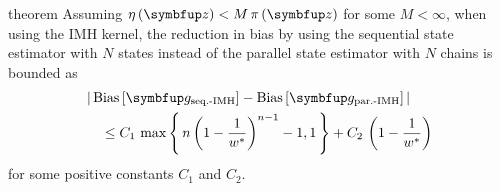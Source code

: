 
\begin{theoremEnd}{theorem}\label{thm:thm_bias_diff}
  Assuming \(\eta\left(\vz\right) < M \, \pi\left(\vz\right)\) for some \(M < \infty\), when using the IMH kernel, the reduction in bias by using the sequential state estimator with \(N\) states instead of the parallel state estimator with \(N\) chains is bounded as
  {\small
  \begin{align*}
    &\abs{
      \text{Bias}\left[\vg_{\text{seq.-IMH}}\right]
      -
      \text{Bias}\left[\vg_{\text{par.-IMH}}\right]
    }
    \\
    &\quad\leq
    C_1 \, \max\left\{\, n \, {\left(1 - \frac{1}{w^*} \right)}^{n-1} - 1, 1 \,\right\}
    +
    C_2 \, \left( 1 - \frac{1}{w^*} \right)
  \end{align*}
  }
  for some positive constants \(C_1\) and \(C_2\).
\end{theoremEnd}
